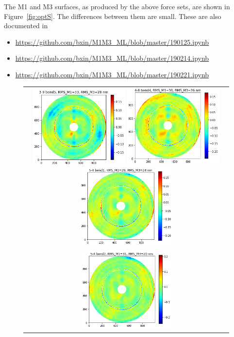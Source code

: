 \documentclass [twoside,openbib,12pt]{article}
\newcommand{\bitm}{\begin{itemize}}
\newcommand{\eitm}{\end{itemize}}
\begin{document}
  The M1 and M3 surfaces, as produced by the above force sets, are
  shown in Figure~\ref{fig:optS}. The differences between them are small.
  These are also documented in
  \bitm
\item \url{https://github.com/bxin/M1M3_ML/blob/master/190125.ipynb}
\item \url{https://github.com/bxin/M1M3_ML/blob/master/190214.ipynb}
\item \url{https://github.com/bxin/M1M3_ML/blob/master/190221.ipynb}
  \eitm
  
 \begin{figure}[bthp]
   \begin{center}
     \begin{tabular}{c}
\includegraphics[width=50mm]{figures/optS1.png}
\includegraphics[width=50mm]{figures/optS3.png}
\includegraphics[width=50mm]{figures/optSa.png} \\
\includegraphics[width=50mm]{figures/optSb.png}

\end{tabular}
\end{center}
\end{figure}
\end{document}

